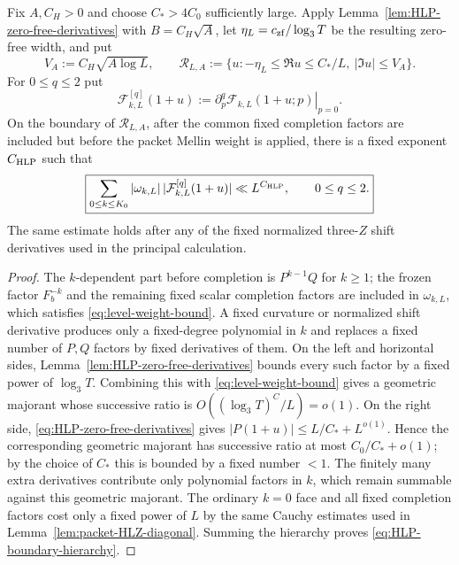 \begin{lemma}
\label{lem:HLP-boundary-hierarchy}
Fix $A,C_H>0$ and choose $C_*>4C_0$ sufficiently large. Apply
Lemma~\ref{lem:HLP-zero-free-derivatives} with $B=C_H\sqrt A$, let
$\eta_L=c_{\rm zf}/\log_3T$ be the resulting zero-free width, and put
\[
V_A:=C_H\sqrt{A\log L},
\qquad
\mathscr R_{L,A}:=
\{u:-\eta_L\le\Re u\le C_*/L,\ |\Im u|\le V_A\}.
\]
For $0\le q\le2$ put
\[
\mathcal F_{k,L}^{[q]}(1+u)
:=\left.\partial_p^q\mathcal F_{k,L}(1+u;p)\right|_{p=0}.
\]
On the boundary of $\mathscr R_{L,A}$, after the common fixed completion
factors are included but before the packet Mellin weight is applied, there is a
fixed exponent $C_{\rm HLP}$ such that
\begin{equation}
\boxed{
\sum_{0\le k\le K_0}
|\omega_{k,L}|\,
|\mathcal F_{k,L}^{[q]}(1+u)|
\ll L^{C_{\rm HLP}},
\qquad 0\le q\le2.
}
\label{eq:HLP-boundary-hierarchy}
\end{equation}
The same estimate holds after any of the fixed normalized three-$Z$ shift
derivatives used in the principal calculation.
\end{lemma}

\begin{proof}
The $k$-dependent part before completion is $P^{k-1}Q$ for $k\ge1$; the frozen
factor $F_b^{-k}$ and the remaining fixed scalar completion factors are
included in $\omega_{k,L}$, which satisfies
\eqref{eq:level-weight-bound}.  A fixed curvature or normalized shift
derivative produces only a fixed-degree polynomial in $k$ and replaces a fixed
number of $P,Q$ factors by fixed derivatives of them.  On the left and
horizontal sides, Lemma~\ref{lem:HLP-zero-free-derivatives} bounds every such
factor by a fixed power of $\log_3T$. Combining this with
\eqref{eq:level-weight-bound} gives a geometric majorant whose successive ratio
is $O((\log_3T)^C/L)=o(1)$. On the right side,
\eqref{eq:HLP-zero-free-derivatives} gives $|P(1+u)|\le L/C_*+L^{o(1)}$.
Hence the corresponding geometric majorant has successive ratio at most
$C_0/C_*+o(1)$; by the choice of $C_*$ this is bounded by a fixed number $<1$.
The finitely many extra derivatives contribute only polynomial factors in $k$,
which remain summable against this geometric majorant.  The ordinary $k=0$ face and all fixed completion factors cost
only a fixed power of $L$ by the same Cauchy estimates used in
Lemma~\ref{lem:packet-HLZ-diagonal}.  Summing the hierarchy proves
\eqref{eq:HLP-boundary-hierarchy}.
\end{proof}

